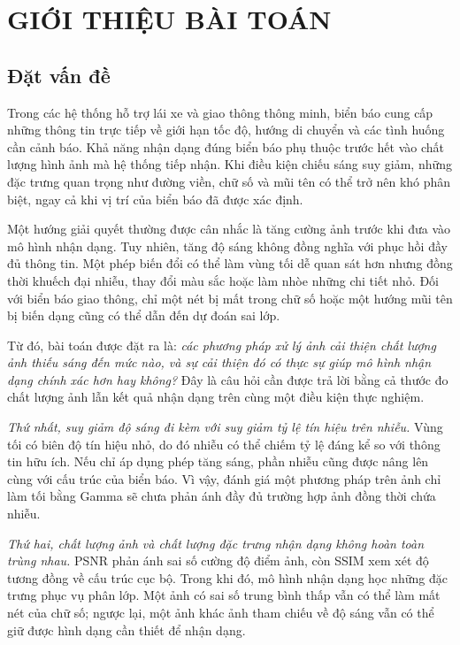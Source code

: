 \section{GIỚI THIỆU BÀI TOÁN}
\subsection{Đặt vấn đề}
Trong các hệ thống hỗ trợ lái xe và giao thông thông minh, biển báo cung cấp những thông tin trực tiếp về giới hạn tốc độ, hướng di chuyển và các tình huống cần cảnh báo. Khả năng nhận dạng đúng biển báo phụ thuộc trước hết vào chất lượng hình ảnh mà hệ thống tiếp nhận. Khi điều kiện chiếu sáng suy giảm, những đặc trưng quan trọng như đường viền, chữ số và mũi tên có thể trở nên khó phân biệt, ngay cả khi vị trí của biển báo đã được xác định.

Một hướng giải quyết thường được cân nhắc là tăng cường ảnh trước khi đưa vào mô hình nhận dạng. Tuy nhiên, tăng độ sáng không đồng nghĩa với phục hồi đầy đủ thông tin. Một phép biến đổi có thể làm vùng tối dễ quan sát hơn nhưng đồng thời khuếch đại nhiễu, thay đổi màu sắc hoặc làm nhòe những chi tiết nhỏ. Đối với biển báo giao thông, chỉ một nét bị mất trong chữ số hoặc một hướng mũi tên bị biến dạng cũng có thể dẫn đến dự đoán sai lớp.

Từ đó, bài toán được đặt ra là: \textit{các phương pháp xử lý ảnh cải thiện chất lượng ảnh thiếu sáng đến mức nào, và sự cải thiện đó có thực sự giúp mô hình nhận dạng chính xác hơn hay không?} Đây là câu hỏi cần được trả lời bằng cả thước đo chất lượng ảnh lẫn kết quả nhận dạng trên cùng một điều kiện thực nghiệm.

\textit{Thứ nhất, suy giảm độ sáng đi kèm với suy giảm tỷ lệ tín hiệu trên nhiễu.} Vùng tối có biên độ tín hiệu nhỏ, do đó nhiễu có thể chiếm tỷ lệ đáng kể so với thông tin hữu ích. Nếu chỉ áp dụng phép tăng sáng, phần nhiễu cũng được nâng lên cùng với cấu trúc của biển báo. Vì vậy, đánh giá một phương pháp trên ảnh chỉ làm tối bằng Gamma sẽ chưa phản ánh đầy đủ trường hợp ảnh đồng thời chứa nhiễu.

\textit{Thứ hai, chất lượng ảnh và chất lượng đặc trưng nhận dạng không hoàn toàn trùng nhau.} PSNR phản ánh sai số cường độ điểm ảnh, còn SSIM xem xét độ tương đồng về cấu trúc cục bộ. Trong khi đó, mô hình nhận dạng học những đặc trưng phục vụ phân lớp. Một ảnh có sai số trung bình thấp vẫn có thể làm mất nét của chữ số; ngược lại, một ảnh khác ảnh tham chiếu về độ sáng vẫn có thể giữ được hình dạng cần thiết để nhận dạng.

